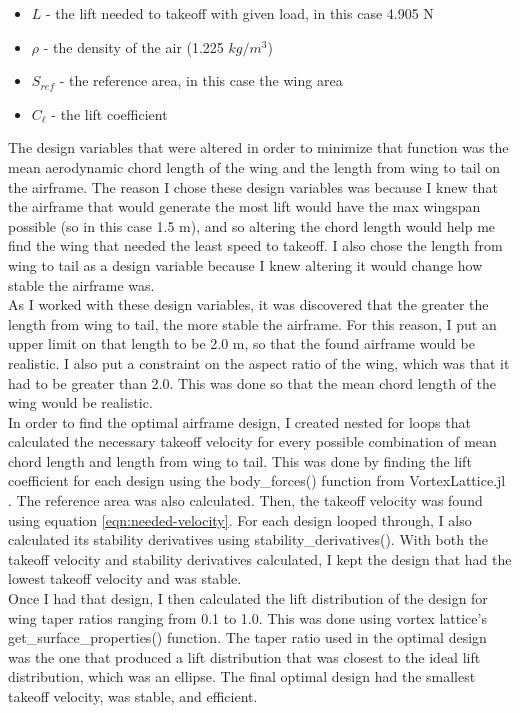 \documentclass[journal]{new-aiaa}
\begin{document}
	\begin{itemize}
		\item \(L\) - the lift needed to takeoff with given load, in this case 4.905 N
		\item \(\rho\) - the density of the air (1.225 \(kg/m^3\))
		\item \(S_{ref}\) - the reference area, in this case the wing area
		\item \(C_{\ell}\) - the lift coefficient
	\end{itemize}
	
	The design variables that were altered in order to minimize that function was the mean aerodynamic chord length of the wing and the length from wing to tail on the airframe. The reason I chose these design variables was because I knew that the airframe that would generate the most lift would have the max wingspan possible (so in this case 1.5 m), and so altering the chord length would help me find the wing that needed the least speed to takeoff. I also chose the length from wing to tail as a design variable because I knew altering it would change how stable the airframe was.\\
	
	As I worked with these design variables, it was discovered that the greater the length from wing to tail, the more stable the airframe. For this reason, I put an upper limit on that length to be 2.0 m, so that the found airframe would be realistic. I also put a constraint on the aspect ratio of the wing, which was that it had to be greater than 2.0. This was done so that the mean chord length of the wing would be realistic.\\
	
	In order to find the optimal airframe design, I created nested for loops that calculated the necessary takeoff velocity for every possible combination of mean chord length and length from wing to tail. This was done by finding the lift coefficient for each design using the body\_forces() function from VortexLattice.jl \cite{McDonnell-Ning}. The reference area was also calculated. Then, the takeoff velocity was found using equation \ref{eqn:needed-velocity}. For each design looped through, I also calculated its stability derivatives using stability\_derivatives(). With both the takeoff velocity and stability derivatives calculated, I kept the design that had the lowest takeoff velocity and was stable.\\
	
	Once I had that design, I then calculated the lift distribution of the design for wing taper ratios ranging from 0.1 to 1.0. This was done using vortex lattice's get\_surface\_properties() function. The taper ratio used in the optimal design was the one that produced a lift distribution that was closest to the ideal lift distribution, which was an ellipse. The final optimal design had the smallest takeoff velocity, was stable, and efficient.\\
	
\end{document}
